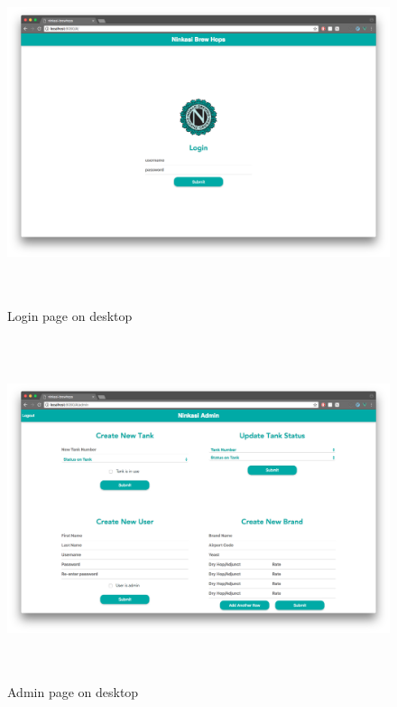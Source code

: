 \documentclass[draftclsnofoot,onecolumn,letterpaper,10pt,compsoc]{IEEEtran}
\begin{document}
\begin{figure}
  \centering
  \includegraphics[height=10cm]{screenshots/desktop/login.png}
  \caption{Login page on desktop}
\end{figure}
\begin{figure}
  \centering
  \centerline{\includegraphics[height=10cm]{screenshots/desktop/admin.png}}
  \caption{Admin page on desktop}
\end{figure}
\end{document}
